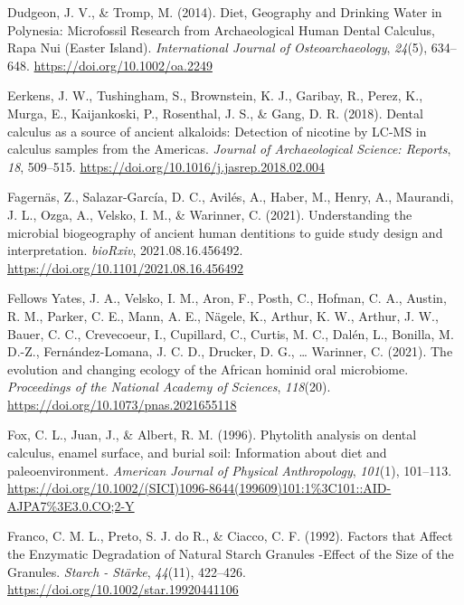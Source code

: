 \documentclass[
  b5paper,
]{book}
\newlength{\cslhangindent}
\newenvironment{CSLReferences}[2] %
 {\begin{list}{}{%
  \setlength{\itemindent}{0pt}
  \setlength{\leftmargin}{0pt}
  \setlength{\parsep}{0pt}
  \ifodd #1
   \setlength{\leftmargin}{\cslhangindent}
   \setlength{\itemindent}{-1\cslhangindent}
  \fi
  \setlength{\itemsep}{#2\baselineskip}}}
 {\end{list}}
\begin{document}
\begin{CSLReferences}{1}{0}
Dudgeon, J. V., \& Tromp, M. (2014). Diet, {Geography} and {Drinking
Water} in {Polynesia}: {Microfossil Research} from {Archaeological Human
Dental Calculus}, {Rapa Nui} ({Easter Island}). \emph{International
Journal of Osteoarchaeology}, \emph{24}(5), 634--648.
\url{https://doi.org/10.1002/oa.2249}

Eerkens, J. W., Tushingham, S., Brownstein, K. J., Garibay, R., Perez,
K., Murga, E., Kaijankoski, P., Rosenthal, J. S., \& Gang, D. R. (2018).
Dental calculus as a source of ancient alkaloids: {Detection} of
nicotine by {LC-MS} in calculus samples from the {Americas}.
\emph{Journal of Archaeological Science: Reports}, \emph{18}, 509--515.
\url{https://doi.org/10.1016/j.jasrep.2018.02.004}

Fagernäs, Z., Salazar-García, D. C., Avilés, A., Haber, M., Henry, A.,
Maurandi, J. L., Ozga, A., Velsko, I. M., \& Warinner, C. (2021).
Understanding the microbial biogeography of ancient human dentitions to
guide study design and interpretation. \emph{bioRxiv},
2021.08.16.456492. \url{https://doi.org/10.1101/2021.08.16.456492}

Fellows Yates, J. A., Velsko, I. M., Aron, F., Posth, C., Hofman, C. A.,
Austin, R. M., Parker, C. E., Mann, A. E., Nägele, K., Arthur, K. W.,
Arthur, J. W., Bauer, C. C., Crevecoeur, I., Cupillard, C., Curtis, M.
C., Dalén, L., Bonilla, M. D.-Z., Fernández-Lomana, J. C. D., Drucker,
D. G., \ldots{} Warinner, C. (2021). The evolution and changing ecology
of the {African} hominid oral microbiome. \emph{Proceedings of the
National Academy of Sciences}, \emph{118}(20).
\url{https://doi.org/10.1073/pnas.2021655118}

Fox, C. L., Juan, J., \& Albert, R. M. (1996). Phytolith analysis on
dental calculus, enamel surface, and burial soil: {Information} about
diet and paleoenvironment. \emph{American Journal of Physical
Anthropology}, \emph{101}(1), 101--113.
\url{https://doi.org/10.1002/(SICI)1096-8644(199609)101:1\%3C101::AID-AJPA7\%3E3.0.CO;2-Y}

Franco, C. M. L., Preto, S. J. do R., \& Ciacco, C. F. (1992). Factors
that {Affect} the {Enzymatic Degradation} of {Natural Starch Granules}
-{Effect} of the {Size} of the {Granules}. \emph{Starch - Stärke},
\emph{44}(11), 422--426. \url{https://doi.org/10.1002/star.19920441106}


\end{CSLReferences}
\end{document}
